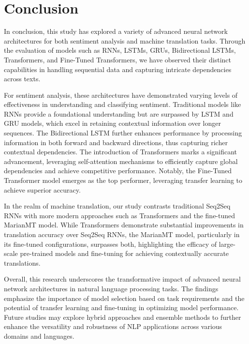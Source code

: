 \documentclass{article}
\begin{document}
\section{Conclusion}
In conclusion, this study has explored a variety of advanced neural network architectures for both sentiment analysis and machine translation tasks. Through the evaluation of models such as RNNs, LSTMs, GRUs, Bidirectional LSTMs, Transformers, and Fine-Tuned Transformers, we have observed their distinct capabilities in handling sequential data and capturing intricate dependencies across texts.

For sentiment analysis, these architectures have demonstrated varying levels of effectiveness in understanding and classifying sentiment. Traditional models like RNNs provide a foundational understanding but are surpassed by LSTM and GRU models, which excel in retaining contextual information over longer sequences. The Bidirectional LSTM further enhances performance by processing information in both forward and backward directions, thus capturing richer contextual dependencies. The introduction of Transformers marks a significant advancement, leveraging self-attention mechanisms to efficiently capture global dependencies and achieve competitive performance. Notably, the Fine-Tuned Transformer model emerges as the top performer, leveraging transfer learning to achieve superior accuracy.

In the realm of machine translation, our study contrasts traditional Seq2Seq RNNs with more modern approaches such as Transformers and the fine-tuned MarianMT model. While Transformers demonstrate substantial improvements in translation accuracy over Seq2Seq RNNs, the MarianMT model, particularly in its fine-tuned configurations, surpasses both, highlighting the efficacy of large-scale pre-trained models and fine-tuning for achieving contextually accurate translations.

Overall, this research underscores the transformative impact of advanced neural network architectures in natural language processing tasks. The findings emphasize the importance of model selection based on task requirements and the potential of transfer learning and fine-tuning in optimizing model performance. Future studies may explore hybrid approaches and ensemble methods to further enhance the versatility and robustness of NLP applications across various domains and languages.
\end{document}
